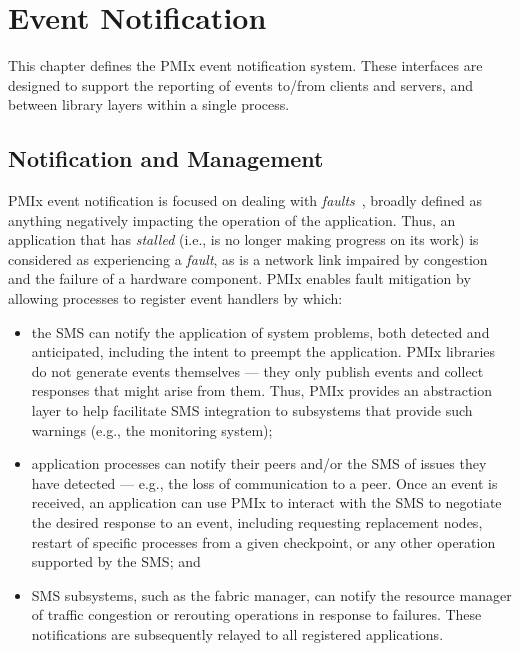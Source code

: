\chapter{Event Notification}
\label{chap:api_event}

This chapter defines the \ac{PMIx} event notification system.
These interfaces are designed to support the reporting of events to/from clients and servers, and between library layers within a single process.

\section{Notification and Management}
\label{chap:api_event:notify}

\ac{PMIx} event notification is focused on dealing with \textit{faults}~\cite{event1,event2}, broadly defined as anything negatively impacting the operation of the application. Thus, an application that has \textit{stalled} (i.e., is no longer making progress on its work) is considered as experiencing a \textit{fault}, as is a network link impaired by congestion and the failure of a hardware component. \ac{PMIx} enables fault mitigation by allowing processes to register event handlers by which:

\begin{itemize}
\item the \ac{SMS} can notify the application of system problems, both detected and anticipated, including the intent to preempt the application. \ac{PMIx} libraries do not generate events themselves --- they only publish events and collect responses that might arise from them. Thus, \ac{PMIx} provides an abstraction layer to help facilitate \ac{SMS} integration to subsystems that provide such warnings (e.g., the monitoring system);

\item application processes can notify their peers and/or the \ac{SMS} of issues they have detected --- e.g., the loss of communication to a peer. Once an event is received, an application can use \ac{PMIx} to interact with the \ac{SMS} to negotiate the desired response to an event, including requesting replacement nodes, restart of specific processes from a given checkpoint, or any other operation supported by the \ac{SMS}; and

\item \ac{SMS} subsystems, such as the fabric manager, can notify the resource manager of traffic congestion or rerouting operations in response to failures. These notifications are subsequently relayed to all registered applications.
\end{itemize}


